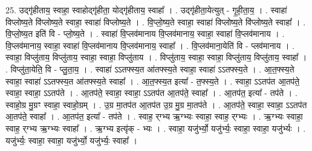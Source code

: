 \documentclass[17pt]{extarticle}
\begin{document}
25. उद्‍गृ॑हीताय॒ स्वाहा॒ स्वाहोद्‍गृ॑हीता॒ योद्‍गृ॑हीताय॒ स्वाहा᳚ । . उद्‍गृ॑हीता॒येत्युत् - गृ॒ही॒ता॒य॒ । . स्वाहा॑ विप्लोष्य॒ते वि॑प्लोष्य॒ते स्वाहा॒ स्वाहा॑ विप्लोष्य॒ते । . वि॒प्लो॒ष्य॒ते स्वाहा॒ स्वाहा॑ विप्लोष्य॒ते वि॑प्लोष्य॒ते स्वाहा᳚ । . वि॒प्लो॒ष्य॒त इति॑ वि - प्लो॒ष्य॒ते । . स्वाहा॑ वि॒प्लव॑मानाय वि॒प्लव॑मानाय॒ स्वाहा॒ स्वाहा॑ वि॒प्लव॑मानाय । . वि॒प्लव॑मानाय॒ स्वाहा॒ स्वाहा॑ वि॒प्लव॑मानाय वि॒प्लव॑मानाय॒ स्वाहा᳚ । . वि॒प्लव॑माना॒येति॑ वि - प्लव॑मानाय । . स्वाहा॒ विप्लु॑ताय॒ विप्लु॑ताय॒ स्वाहा॒ स्वाहा॒ विप्लु॑ताय । . विप्लु॑ताय॒ स्वाहा॒ स्वाहा॒ विप्लु॑ताय॒ विप्लु॑ताय॒ स्वाहा᳚ । . विप्लु॑ता॒येति॒ वि - प्लु॒ता॒य॒ । . स्वाहा॑ ऽऽतफ्स्य॒त आ॑तफ्स्य॒ते स्वाहा॒ स्वाहा॑ ऽऽतफ्स्य॒ते । . आ॒त॒फ्स्य॒ते स्वाहा॒ स्वाहा॑ ऽऽतफ्स्य॒त आ॑तफ्स्य॒ते स्वाहा᳚ । . आ॒त॒फ्स्य॒त इत्या᳚ - त॒फ्स्य॒ते । . स्वाहा॒ ऽऽतप॑त आ॒तप॑ते॒ स्वाहा॒ स्वाहा॒ ऽऽतप॑ते । . आ॒तप॑ते॒ स्वाहा॒ स्वाहा॒ ऽऽतप॑त आ॒तप॑ते॒ स्वाहा᳚ । . आ॒तप॑त॒ इत्या᳚ - तप॑ते । . स्वाहो॒ग्र मु॒ग्रꣳ स्वाहा॒ स्वाहो॒ग्रम् । . उ॒ग्र मा॒तप॑त आ॒तप॑त उ॒ग्र मु॒ग्र मा॒तप॑ते । . आ॒तप॑ते॒ स्वाहा॒ स्वाहा॒ ऽऽतप॑त आ॒तप॑ते॒ स्वाहा᳚ । . आ॒तप॑त॒ इत्या᳚ - तप॑ते । . स्वाह॒ र्‌ग्भ्य ऋ॒ग्भ्यः स्वाहा॒ स्वाह॒ र्‌ग्भ्यः । . ऋ॒ग्भ्यः स्वाहा॒ स्वाह॒ र्‌ग्भ्य ऋ॒ग्भ्यः स्वाहा᳚ । . ऋ॒ग्भ्य इत्यृ॑क् - भ्यः । . स्वाहा॒ यजु॑र्भ्यो॒ यजु॑र्भ्यः॒ स्वाहा॒ स्वाहा॒ यजु॑र्भ्यः । . यजु॑र्भ्यः॒ स्वाहा॒ स्वाहा॒ यजु॑र्भ्यो॒ यजु॑र्भ्यः॒ स्वाहा᳚ । \newline
\end{document}
